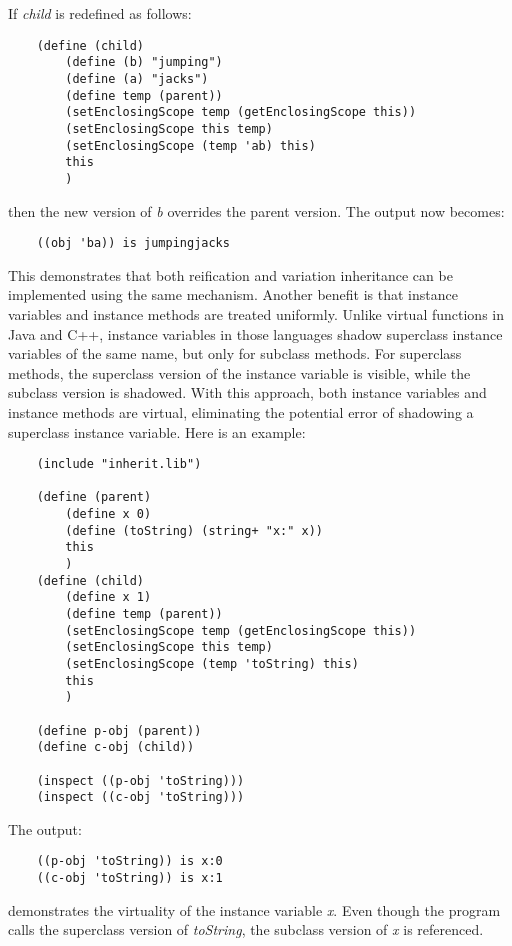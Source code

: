 {{If {\it child} is redefined as follows:

\begin{verbatim}
    (define (child)
        (define (b) "jumping")
        (define (a) "jacks")
        (define temp (parent))
        (setEnclosingScope temp (getEnclosingScope this))
        (setEnclosingScope this temp)
        (setEnclosingScope (temp 'ab) this)
        this
        )
\end{verbatim}

then the new version of {\it b} overrides the parent version.  The output
now becomes:

\begin{verbatim}
    ((obj 'ba)) is jumpingjacks 
\end{verbatim}

This demonstrates that both reification and variation inheritance can be
implemented using the same mechanism.  Another benefit is that instance
variables and instance methods are treated uniformly. Unlike virtual
functions in Java and C++, instance variables in those languages shadow
superclass instance variables of the same name, but only for subclass
methods.  For superclass methods, the superclass version of the instance
variable is visible, while the subclass version is shadowed.  With this
approach, both instance variables and instance methods are virtual,
eliminating the potential error of shadowing a superclass instance
variable. Here is an example:

\begin{verbatim}
    (include "inherit.lib")

    (define (parent)
        (define x 0)
        (define (toString) (string+ "x:" x))
        this
        )
    (define (child)
        (define x 1)
        (define temp (parent))
        (setEnclosingScope temp (getEnclosingScope this))
        (setEnclosingScope this temp)
        (setEnclosingScope (temp 'toString) this)
        this
        )

    (define p-obj (parent))
    (define c-obj (child))

    (inspect ((p-obj 'toString)))
    (inspect ((c-obj 'toString)))
\end{verbatim}

The output:

\begin{verbatim}
    ((p-obj 'toString)) is x:0
    ((c-obj 'toString)) is x:1
\end{verbatim}

demonstrates the virtuality of the instance variable \emph{x}.  Even
though the program calls the superclass version of \emph{toString},
the subclass version of \emph{x} is referenced.

}}
